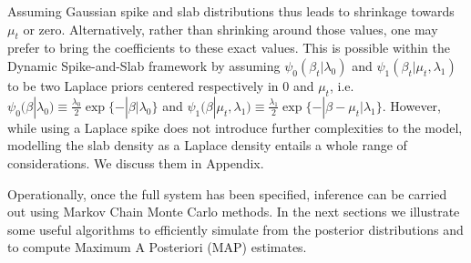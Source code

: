 \documentclass[
  12pt,
]{book}
\theoremstyle{break}
\theoremstyle{nonumberplain}
\begin{document}
Assuming Gaussian spike and slab distributions thus leads to shrinkage
towards \(\mu_{t}\) or zero. Alternatively, rather than shrinking around
those values, one may prefer to bring the coefficients to these exact
values. This is possible within the Dynamic Spike-and-Slab framework by
assuming \(\psi_{0}(\beta_{t}|\lambda_{0})\) and
\(\psi_{1}(\beta_{t}|\mu_{t},\lambda_{1})\) to be two Laplace priors
centered respectively in \(0\) and \(\mu_{t}\),
i.e.~\(\psi_{0}(\beta|\lambda_{0})\equiv \frac{\lambda_{0}}{2}\exp\{-|\beta|\lambda_{0}\}\)
and
\(\psi_{1}(\beta|\mu_{t},\lambda_{1})\equiv \frac{\lambda_{1}}{2}\exp\{-|\beta-\mu_{t}|\lambda_{1}\}\).
However, while using a Laplace spike does not introduce further
complexities to the model, modelling the slab density as a Laplace
density entails a whole range of considerations. We discuss them in
Appendix.

Operationally, once the full system has been specified, inference can be
carried out using Markov Chain Monte Carlo methods. In the next sections
we illustrate some useful algorithms to efficiently simulate from the
posterior distributions and to compute Maximum A Posteriori (MAP)
estimates.
\end{document}
